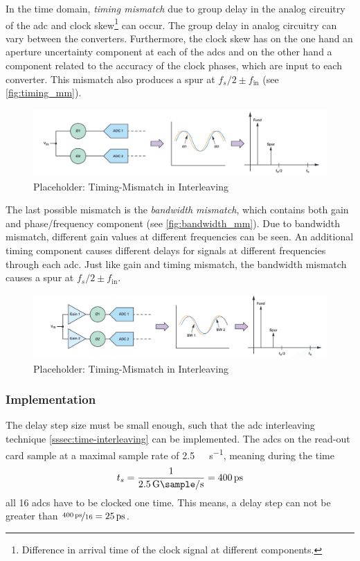 In the time domain, \textit{timing mismatch} due to group delay in the analog circuitry of the \gls{adc} and clock skew\footnote{Difference in arrival time of the clock signal at different components.} can occur. The group delay in analog circuitry can vary between the converters. Furthermore, the clock skew has on the one hand an aperture uncertainty component at each of the \glspl{adc} and on the other hand a component related to the accuracy of the clock phases, which are input to each converter. \cite{Harris2019} This mismatch also produces a spur at $f_s/2 \pm f_{\text{in}}$ (see \autoref{fig:timing_mm}).

\begin{figure}[tbh]
	\centering
	\includegraphics[width = \textwidth]{chap/02-theory/img/timing_mm}
	\caption{Placeholder: Timing-Mismatch in Interleaving \cite{Harris2019}}
	\label{fig:timing_mm}
\end{figure}

The last possible mismatch is the \textit{bandwidth mismatch}, which contains both gain and phase/frequency component (see \autoref{fig:bandwidth_mm}). Due to bandwidth mismatch, different gain values at different frequencies can be seen. An additional timing component causes different delays for signals at different frequencies through each \gls{adc}. Just like gain and timing mismatch, the bandwidth mismatch causes a spur at $f_s/2 \pm f_{\text{in}}$.
\begin{figure}[tbh]
	\centering
	\includegraphics[width = \textwidth]{chap/02-theory/img/bandwidth_mm}
	\caption{Placeholder: Timing-Mismatch in Interleaving \cite{Harris2019}}
	\label{fig:bandwidth_mm}
\end{figure}

\subsubsection{Implementation}\label{ssec:interl_impl}
The delay step size must be small enough, such that the \gls{adc} interleaving technique \autoref{sssec:time-interleaving} can be implemented.
The \glspl{adc} on the read-out card sample at a maximal sample rate of \SI{2.5}{\giga \sample \per \second}, meaning during the time
\begin{equation}
	t_s = \frac{1}{\SI{2.5}{\giga \sample \per \second}} = \SI{400}{\pico \second}
\end{equation}
all 16 \glspl{adc} have to be clocked one time.
This means, a delay step can not be greater than $\nicefrac{\SI{400}{\pico\second}}{16} = \SI{25}{\pico\second}$.

